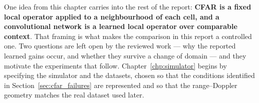 One idea from this chapter carries into the rest of the report: \textbf{CFAR is a fixed local
operator applied to a neighbourhood of each cell, and a convolutional network is a learned local
operator over comparable context}. That framing is what makes the comparison in this report a
controlled one. Two questions are left open by the reviewed work --- why the reported learned gains
occur, and whether they survive a change of domain --- and they motivate the experiments that follow.
Chapter~\ref{chp:simulator} begins by specifying the simulator and the datasets, chosen so that the
conditions identified in Section~\ref{sec:cfar_failures} are represented and so that the
range--Doppler geometry matches the real dataset used later.
